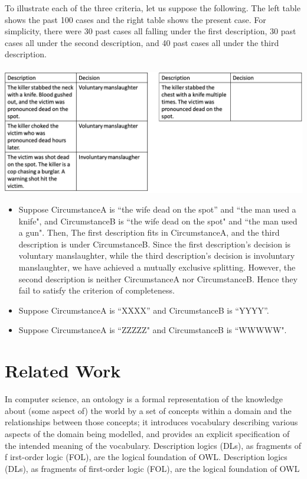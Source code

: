 \documentclass{llncs}%
\begin{document}
\begin{example} 
  To illustrate each of the three criteria, let us suppose the following. The left table shows the past 100 cases and the right table 
	shows the present case. For simplicity, there were 30 past cases all falling under the first description, 
	30 past cases all under the second description, and 40 past cases all under the third description. \\\\ 
	\includegraphics[scale=0.4]{table1.png}

	\begin{itemize} 
		\item Suppose CircumstanceA is ``the wife dead on the spot'' and ``the man used a knife", and CircumstanceB is ``the wife dead on the spot" 
			and ``the man used a gun".  Then, The first description fits in CircumstanceA, and the third description is under CircumstanceB. 
			Since the first description's decision is voluntary manslaughter, while the third description's decision is involuntary manslaughter, 
			we have achieved a mutually exclusive splitting. However, the second description is neither CircumstanceA nor CircumstanceB. 
			Hence they fail to satisfy the criterion of completeness.  
		\item Suppose CircumstanceA is ``XXXX'' and CircumstanceB is ``YYYY''. 
		\item Suppose CircumstanceA is ``ZZZZZ" and CircumstanceB is ``WWWWW".
	\end{itemize} 
	


\end{example} 




\section{Related Work}\label{sec:related}
In computer science, an ontology is a formal representation of the knowledge about (some aspect of) the world by a set of concepts within a domain and the relationships between those concepts; it introduces vocabulary describing various aspects of the domain being modelled, and provides an explicit specification of the intended meaning of the vocabulary. Description logics (DLs), as fragments of f irst-order logic (FOL), are the logical foundation of OWL.
Description logics (DLs), as fragments of first-order logic (FOL), are the logical foundation of OWL
\end{document}
